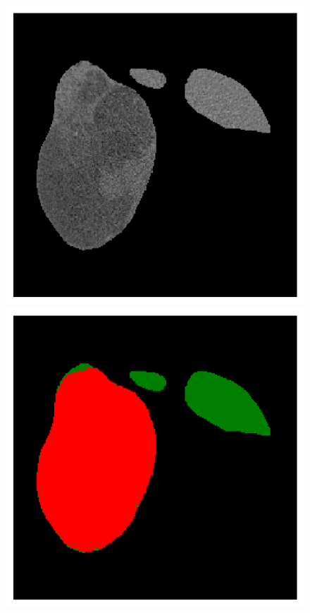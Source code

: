 \begin{figure}[!ht]
	\centering
	\begin{minipage}{4cm}
		\includegraphics[width=\linewidth]{images/ResizeTumorMult_Raw_Pat5_0}
	\end{minipage} \hspace{-0.3cm}
	\begin{minipage}{4cm}
		\includegraphics[width=\linewidth]{images/ResizeTumorMult_GT_Pat5_0}

\end{minipage}
\end{figure}
